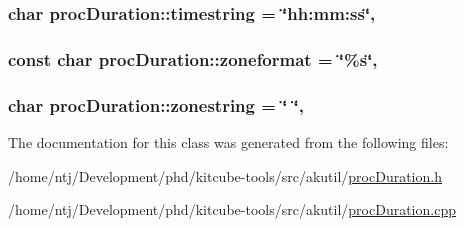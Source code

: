 \hypertarget{classprocDuration_ade868d17a31ee89d3453e8a32bf70c07}{
\subsubsection[{timestring}]{\setlength{\rightskip}{0pt plus 5cm}char proc\-Duration\-::timestring = \char`\"{}hh\-:mm\-:ss\char`\"{}\hspace{0.3cm}{\ttfamily [static]}, {\ttfamily [protected]}}}\label{classprocDuration_ade868d17a31ee89d3453e8a32bf70c07}
\hypertarget{classprocDuration_ac49a8c3058ed4ee10c2a61f03efafd96}{
\subsubsection[{zoneformat}]{\setlength{\rightskip}{0pt plus 5cm}const char proc\-Duration\-::zoneformat = \char`\"{}\%s\char`\"{}\hspace{0.3cm}{\ttfamily [static]}, {\ttfamily [protected]}}}\label{classprocDuration_ac49a8c3058ed4ee10c2a61f03efafd96}
\hypertarget{classprocDuration_a17e137b5abce3b50940a058c3b30f7e5}{
\subsubsection[{zonestring}]{\setlength{\rightskip}{0pt plus 5cm}char proc\-Duration\-::zonestring = \char`\"{} \char`\"{}\hspace{0.3cm}{\ttfamily [static]}, {\ttfamily [protected]}}}\label{classprocDuration_a17e137b5abce3b50940a058c3b30f7e5}


The documentation for this class was generated from the following files\-:\begin{DoxyCompactItemize}
\item 
/home/ntj/\-Development/phd/kitcube-\/tools/src/akutil/\hyperlink{procDuration_8h}{proc\-Duration.\-h}\item 
/home/ntj/\-Development/phd/kitcube-\/tools/src/akutil/\hyperlink{procDuration_8cpp}{proc\-Duration.\-cpp}\end{DoxyCompactItemize}
